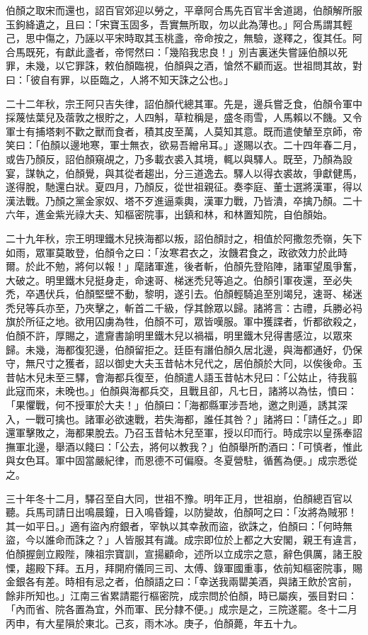 \begin{pinyinscope}
 伯顏之取宋而還也，詔百官郊迎以勞之，平章阿合馬先百官半舍道謁，伯顏解所服玉鉤絳遺之，且曰：「宋寶玉固多，吾實無所取，勿以此為薄也。」阿合馬謂其輕己，思中傷之，乃誣以平宋時取其玉桃盞，帝命按之，無驗，遂釋之，復其任。阿合馬既死，有獻此盞者，帝愕然曰：「幾陷我忠良！」別吉裏迷失嘗誣伯顏以死罪，未幾，以它罪誅，敕伯顏臨視，伯顏與之酒，愴然不顧而返。世祖問其故，對曰：「彼自有罪，以臣臨之，人將不知天誅之公也。」



 二十二年秋，宗王阿只吉失律，詔伯顏代總其軍。先是，邊兵嘗乏食，伯顏令軍中採蔑怯葉兒及蓿敦之根貯之，人四斛，草粒稱是，盛冬雨雪，人馬賴以不饑。又令軍士有捕塔剌不歡之獸而食者，積其皮至萬，人莫知其意。既而遣使輦至京師，帝笑曰：「伯顏以邊地寒，軍士無衣，欲易吾繒帛耳。」遂賜以衣。二十四年春二月，或告乃顏反，詔伯顏窺覘之，乃多載衣裘入其境，輒以與驛人。既至，乃顏為設宴，謀執之，伯顏覺，與其從者趨出，分三道逸去。驛人以得衣裘故，爭獻健馬，遂得脫，馳還白狀。夏四月，乃顏反，從世祖親征。奏李庭、董士選將漢軍，得以漢法戰。乃顏之黨金家奴、塔不歹進逼乘輿，漢軍力戰，乃皆潰，卒擒乃顏。二十六年，進金紫光祿大夫、知樞密院事，出鎮和林，和林置知院，自伯顏始。



 二十九年秋，宗王明理鐵木兒挾海都以叛，詔伯顏討之，相值於阿撒忽禿嶺，矢下如雨，眾軍莫敢登，伯顏令之曰：「汝寒君衣之，汝饑君食之，政欲效力於此時爾。於此不勉，將何以報！」麾諸軍進，後者斬，伯顏先登陷陣，諸軍望風爭奮，大破之。明里鐵木兒挺身走，命速哥、梯迷禿兒等追之。伯顏引軍夜還，至必失禿，卒遇伏兵，伯顏堅壁不動，黎明，遂引去。伯顏輕騎追至別竭兒，速哥、梯迷禿兒等兵亦至，乃夾擊之，斬首二千級，俘其餘眾以歸。諸將言：古禮，兵勝必祃旗於所征之地。欲用囚虜為牲，伯顏不可，眾皆嘆服。軍中獲諜者，忻都欲殺之，伯顏不許，厚賜之，遣齎書諭明里鐵木兒以禍福，明里鐵木兒得書感泣，以眾來歸。未幾，海都復犯邊，伯顏留拒之。廷臣有譖伯顏久居北邊，與海都通好，仍保守，無尺寸之獲者，詔以御史大夫玉昔帖木兒代之，居伯顏於大同，以俟後命。玉昔帖木兒未至三驛，會海都兵復至，伯顏遣人語玉昔帖木兒曰：「公姑止，待我翦此寇而來，未晚也。」伯顏與海都兵交，且戰且卻，凡七日，諸將以為怯，憤曰：「果懼戰，何不授軍於大夫！」伯顏曰：「海都縣軍涉吾地，邀之則遁，誘其深入，一戰可擒也。諸軍必欲速戰，若失海都，誰任其咎？」諸將曰：「請任之。」即還軍擊敗之，海都果脫去。乃召玉昔帖木兒至軍，授以印而行。時成宗以皇孫奉詔撫軍北邊，舉酒以餞曰：「公去，將何以教我？」伯顏舉所酌酒曰：「可慎者，惟此與女色耳。軍中固當嚴紀律，而恩德不可偏廢。冬夏營駐，循舊為便。」成宗悉從之。



 三十年冬十二月，驛召至自大同，世祖不豫。明年正月，世祖崩，伯顏總百官以聽。兵馬司請日出鳴晨鐘，日入鳴昏鐘，以防變故，伯顏呵之曰：「汝將為賊邪！其一如平日。」適有盜內府銀者，宰執以其幸赦而盜，欲誅之，伯顏曰：「何時無盜，今以誰命而誅之？」人皆服其有識。成宗即位於上都之大安閣，親王有違言，伯顏握劍立殿陛，陳祖宗寶訓，宣揚顧命，述所以立成宗之意，辭色俱厲，諸王股慄，趨殿下拜。五月，拜開府儀同三司、太傅、錄軍國重事，依前知樞密院事，賜金銀各有差。時相有忌之者，伯顏語之曰：「幸送我兩罌美酒，與諸王飲於宮前，餘非所知也。」江南三省累請罷行樞密院，成宗問於伯顏，時已屬疾，張目對曰：「內而省、院各置為宜，外而軍、民分隸不便。」成宗是之，三院遂罷。冬十二月丙申，有大星隕於東北。己亥，雨木冰。庚子，伯顏薨，年五十九。




\end{pinyinscope}

